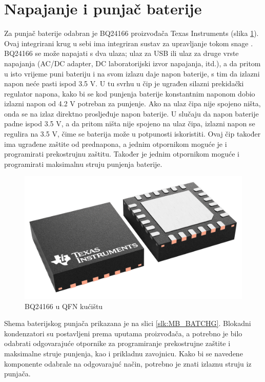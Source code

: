 \section{Napajanje i punjač baterije}
Za punjač baterije odabran je BQ24166 proizvođača Texas Instruments (slika \ref{slk:BQ24166}). Ovaj integrirani krug u sebi ima integriran sustav za upravljanje tokom snage \cite{ti:bq24166}. BQ24166 se može napajati s dva ulaza; ulaz za USB ili ulaz za druge vrste napajanja (AC/DC adapter, DC laboratorijski izvor napajanja, itd.), a da pritom u isto vrijeme puni bateriju i na svom izlazu daje napon baterije, s tim da izlazni napon neće pasti ispod 3.5 V. U tu svrhu u čip je ugrađen silazni prekidački regulator napona, kako bi se kod punjenja baterije konstantnim naponom dobio izlazni napon od 4.2 V potreban za punjenje. Ako na ulaz čipa nije spojeno ništa, onda se na izlaz direktno prosljeđuje napon baterije. U slučaju da napon baterije padne ispod 3.5 V, a da pritom ništa nije spojeno na ulaz čipa, izlazni napon se regulira na 3.5 V, čime se baterija može u potpunosti iskoristiti. Ovaj čip također ima ugrađene zaštite od prednapona, a jednim otpornikom moguće je i programirati prekostrujnu zaštitu. Također je jednim otpornikom moguće i programirati maksimalnu struju punjenja baterije.
\begin{figure}[hbt]
    \centering
    \includegraphics[width = 10 cm]{Figures/bq24166.png}
    \caption{BQ24166 u QFN kućištu}
    \label{slk:BQ24166}
\end{figure}
Shema baterijskog punjača prikazana je na slici \ref{slk:MB_BATCHG}. Blokadni kondenzatori su postavljeni prema uputama proizvođača, a potrebno je bilo odabrati odgovarajuće otpornike za programiranje prekostrujne zaštite i maksimalne struje punjenja, kao i prikladnu zavojnicu. Kako bi se navedene komponente odabrale na odgovarajuć način, potrebno je znati izlaznu struju iz punjača.
